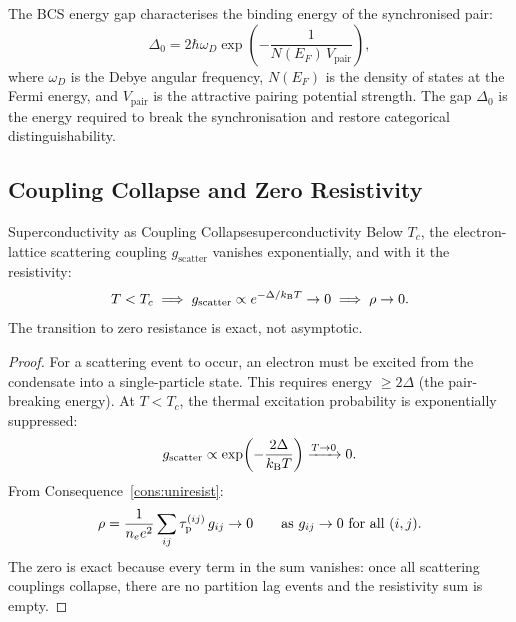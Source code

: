 The BCS energy gap characterises the binding energy of the synchronised
pair:
\begin{equation}
  \Delta_0 = 2\hbar\omega_D
    \exp\!\left(-\frac{1}{N(E_F)\,V_{\mathrm{pair}}}\right),
  \label{eq:ch18-bcsgap}
\end{equation}
where $\omega_D$ is the Debye angular frequency, $N(E_F)$ is the density
of states at the Fermi energy, and $V_{\mathrm{pair}}$ is the attractive
pairing potential strength.  The gap $\Delta_0$ is the energy required to
break the synchronisation and restore categorical distinguishability.

\subsection{Coupling Collapse and Zero Resistivity}

\begin{consequence}{Superconductivity as Coupling Collapse}{superconductivity}
Below $T_c$, the electron-lattice scattering coupling $g_{\mathrm{scatter}}$
vanishes exponentially, and with it the resistivity:
\begin{equation}
  T < T_c \implies g_{\mathrm{scatter}} \propto e^{-\Delta/k_{\mathrm{B}} T}
    \to 0 \implies \rho \to 0.
  \label{eq:ch18-supercond}
\end{equation}
The transition to zero resistance is exact, not asymptotic.
\end{consequence}

\begin{proof}
For a scattering event to occur, an electron must be excited from the
condensate into a single-particle state.  This requires energy
$\geq 2\Delta$ (the pair-breaking energy).  At $T < T_c$, the thermal
excitation probability is exponentially suppressed:
\begin{equation}
  g_{\mathrm{scatter}} \propto \exp\!\left(-\frac{2\Delta}{k_{\mathrm{B}} T}\right)
    \xrightarrow{T \to 0} 0.
  \label{eq:ch18-coupling-exp}
\end{equation}
From Consequence~\ref{cons:uniresist}:
\begin{equation}
  \rho = \frac{1}{n_e e^2}\sum_{ij}\tau_{\mathrm{p}}^{(ij)}\,g_{ij}
    \to 0 \qquad \text{as } g_{ij} \to 0 \text{ for all } (i,j).
\end{equation}
The zero is exact because every term in the sum vanishes: once all
scattering couplings collapse, there are no partition lag events and the
resistivity sum is empty.
\end{proof}

